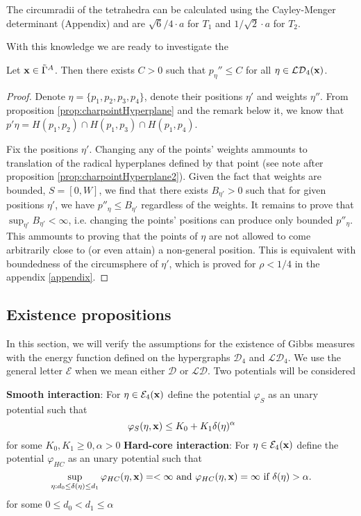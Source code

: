 The circumradii of the tetrahedra can be calculated using the Cayley-Menger determinant (Appendix) and are $\sqrt{6}/4 \cdot a$ for $T_1$ and $1/\sqrt{2}\cdot a$ for $T_2$.

With this knowledge we are ready to investigate the 
\begin{proposition}\label{prop:maxPeta}
Let ${\mathbf{x}} \in \tilde\Gamma^A$. Then there exists $C>0$ such that $p_\eta'' \leq C$ for all $\eta \in \mathcal {LD}_4({\mathbf{x}})$. 
\end{proposition}
\begin{proof}
Denote $\eta=\{p_1,p_2,p_3,p_4\}$, denote their positions $\eta'$ and weights $\eta''$. From proposition \ref{prop:charpointHyperplane} and the remark below it, we know that $p'\eta = H(p_1,p_2)\cap H(p_1,p_3) \cap H(p_1,p_4)$.

Fix the positions $\eta'$.  Changing any of the points' weights ammounts to translation of the radical hyperplanes defined by that point (see note after proposition \ref{prop:charpointHyperplane2}). Given the fact that weights are bounded, $S=[0,W]$, we find that there exists $B_{\eta'}>0$ such that for given positions $\eta'$, we have $p''_\eta \leq B_{\eta'}$ regardless of the weights.
It remains to prove that $\sup_{\eta'} B_{\eta'} < \infty$, i.e. changing the points' positions can produce only bounded $p''_\eta$. This ammounts to proving that the points of $\eta$ are not allowed to come arbitrarily close to (or even attain) a non-general position. This is equivalent with boundedness of the circumsphere of $\eta'$, which is proved for $\rho<1/4$ in the appendix \ref{appendix}.
\end{proof}




\subsection{Existence propositions}
In this section, we will verify the assumptions for the existence of Gibbs measures with the energy function defined on the hypergraphs $\mathcal D_4$ and $\mathcal {LD}_4$. We use the general letter $\mathcal E$ when we mean either $\mathcal D$ or $\mathcal {LD}$. Two potentials will be considered

\textbf{Smooth interaction}:  For $\eta\in\mathcal E_4({\mathbf{x}})$ define the potential $\varphi_S$ as an unary potential such that
$$\varphi_S(\eta,{\mathbf{x}}) \leq K_0 + K_1 \delta(\eta)^{\alpha}$$
for some $K_0,K_1 \geq 0, \alpha >0$
\textbf{Hard-core interaction}: For $\eta\in\mathcal E_4({\mathbf{x}})$ define the potential $\varphi_{HC}$ as an unary potential such that
$$\sup_{\eta: d_0 \leq \delta(\eta) \leq d_1} \varphi_{HC}(\eta,{\mathbf{x}}) = < \infty \text{ and } \varphi_{HC}(\eta,{\mathbf{x}})=\infty \text{ if } \delta(\eta)>\alpha.$$ 
for some $0\leq d_0 < d_1 \leq \alpha$ 

